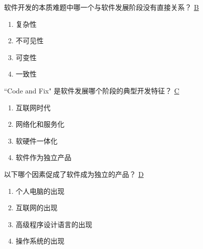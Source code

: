 \begin{problem}
    软件开发的本质难题中哪一个与软件发展阶段没有直接关系？
    \uline{B}    
    \vspace{-0.8em}
    \begin{multicols}{4}
        \begin{enumerate}[label=\Alph*.]
            \item 复杂性
            \item 不可见性
            \item 可变性
            \item 一致性
        \end{enumerate}
    \end{multicols}
    \vspace{-1em}
\end{problem}



\begin{problem}
    ``Code and Fix" 是软件发展哪个阶段的典型开发特征？
    \uline{C}    
    \vspace{-0.8em}
    \begin{multicols}{4}
        \begin{enumerate}[label=\Alph*.]
            \item 互联网时代
            \item 网络化和服务化
            \item 软硬件一体化
            \item 软件作为独立产品
        \end{enumerate}
    \end{multicols}
    \vspace{-1em}
\end{problem}



\begin{problem}
    以下哪个因素促成了软件成为独立的产品？
    \uline{D}    
    \vspace{-0.8em}
    \begin{multicols}{2}
        \begin{enumerate}[label=\Alph*.]
            \item 个人电脑的出现
            \item 互联网的出现
            \item 高级程序设计语言的出现
            \item 操作系统的出现
        \end{enumerate}
    \end{multicols}
    \vspace{-1em}
\end{problem}



